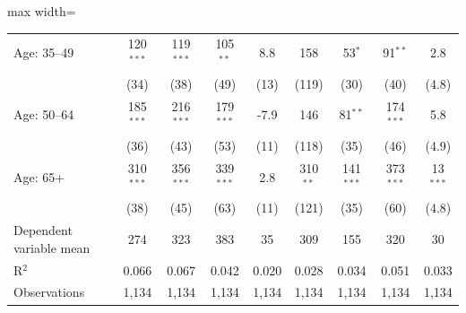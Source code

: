 \begin{table}[htbp]
\begin{adjustbox}{max width=\textwidth}
\begin{tabular}{lcccccccc}
Age: 35--49 & 120$^{***}$ & 119$^{***}$ & 105$^{**}$ & 8.8 & 158 & 53$^{*}$ & 91$^{**}$ & 2.8 \\
 & (34) & (38) & (49) & (13) & (119) & (30) & (40) & (4.8) \\
Age: 50--64 & 185$^{***}$ & 216$^{***}$ & 179$^{***}$ & -7.9 & 146 & 81$^{**}$ & 174$^{***}$ & 5.8 \\
 & (36) & (43) & (53) & (11) & (118) & (35) & (46) & (4.9) \\
Age: 65+ & 310$^{***}$ & 356$^{***}$ & 339$^{***}$ & 2.8 & 310$^{**}$ & 141$^{***}$ & 373$^{***}$ & 13$^{***}$ \\
 & (38) & (45) & (63) & (11) & (121) & (35) & (60) & (4.8) \\
Dependent variable mean & 274 & 323 & 383 & 35 & 309 & 155 & 320 & 30 \\
R$^2$ & 0.066 & 0.067 & 0.042 & 0.020 & 0.028 & 0.034 & 0.051 & 0.033 \\
Observations & 1,134 & 1,134 & 1,134 & 1,134 & 1,134 & 1,134 & 1,134 & 1,134 \\
\bottomrule
\end{tabular}
\end{adjustbox}
\end{table}
